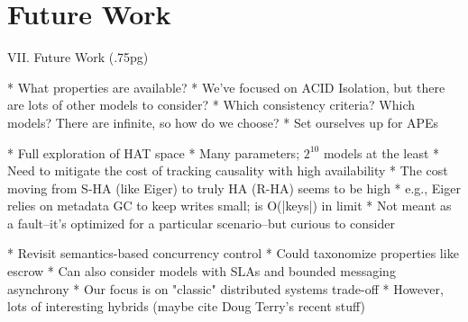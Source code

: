 
\section{Future Work}
\label{sec:futurework}

VII. Future Work (.75pg)

* What properties are available?
	* We've focused on ACID Isolation, but there are lots of other models to consider?
	* Which consistency criteria? Which models? There are infinite, so how do we choose?
	* Set ourselves up for APEs

* Full exploration of HAT space
	* Many parameters; $2^10$ models at the least
	* Need to mitigate the cost of tracking causality with high availability
		* The cost moving from S-HA (like Eiger) to truly HA (R-HA) seems to be high
		* e.g., Eiger relies on metadata GC to keep writes small; is O(|keys|) in limit
			* Not meant as a fault--it's optimized for a particular scenario--but curious to consider

* Revisit semantics-based concurrency control
	* Could taxonomize properties like escrow
	* Can also consider models with SLAs and bounded messaging asynchrony
	* Our focus is on "classic" distributed systems trade-off
		* However, lots of interesting hybrids (maybe cite Doug Terry's recent stuff)

